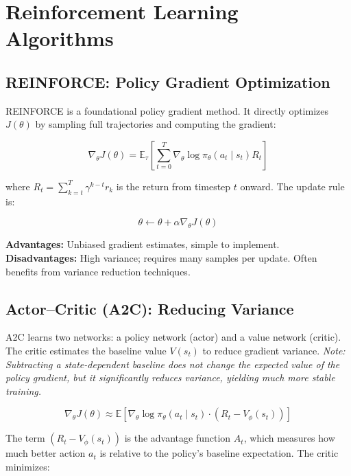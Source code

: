 \documentclass[11pt]{article}
\begin{document}
\section{Reinforcement Learning Algorithms}

\subsection{REINFORCE: Policy Gradient Optimization}
REINFORCE is a foundational policy gradient method. It directly optimizes $J(\theta)$ by sampling full trajectories and computing the gradient:

\begin{equation}
\nabla_\theta J(\theta) = \mathbb{E}_\tau \left[ \sum_{t=0}^{T} \nabla_\theta \log \pi_\theta(a_t\mid s_t) R_t \right]
\end{equation}

where $R_t = \sum_{k=t}^{T} \gamma^{k-t} r_k$ is the return from timestep $t$ onward. The update rule is:

\begin{equation}
\theta \leftarrow \theta + \alpha \nabla_\theta J(\theta)
\end{equation}

\textbf{Advantages:} Unbiased gradient estimates, simple to implement.
\textbf{Disadvantages:} High variance; requires many samples per update. Often benefits from variance reduction techniques.

\subsection{Actor--Critic (A2C): Reducing Variance}
A2C learns two networks: a policy network (actor) and a value network (critic). The critic estimates the baseline value $V(s_t)$ to reduce gradient variance. \textit{Note: Subtracting a state-dependent baseline does not change the expected value of the policy gradient, but it significantly reduces variance, yielding much more stable training.}

\begin{equation}
\nabla_\theta J(\theta) \approx \mathbb{E} \left[ \nabla_\theta \log \pi_\theta(a_t\mid s_t) \cdot (R_t - V_\phi(s_t)) \right]
\end{equation}

The term $(R_t - V_\phi(s_t))$ is the advantage function $A_t$, which measures how much better action $a_t$ is relative to the policy's baseline expectation. The critic minimizes:
\end{document}

